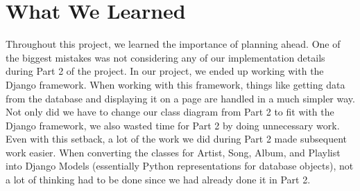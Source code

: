 \documentclass[12pt]{article}
\begin{document}
\section{What We Learned}
Throughout this project, we learned the importance of planning ahead. One of the biggest mistakes was not considering any of our implementation details during Part 2 of the project. In our project, we ended up working with the Django framework. When working with this framework, things like getting data from the database and displaying it on a page are handled in a much simpler way. Not only did we have to change our class diagram from Part 2 to fit with the Django framework, we also wasted time for Part 2 by doing unnecessary work. Even with this setback, a lot of the work we did during Part 2 made subsequent work easier. When converting the classes for Artist, Song, Album, and Playlist into Django Models (essentially Python representations for database objects), not a lot of thinking had to be done since we had already done it in Part 2.
\end{document}
